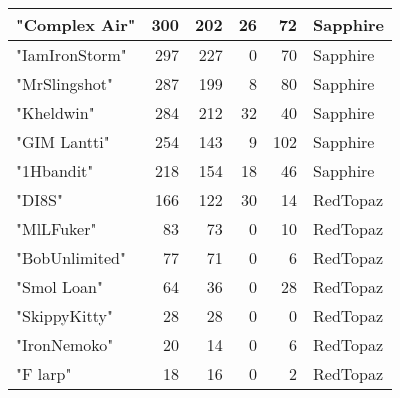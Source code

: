 \documentclass{article}
\begin{document}
\begin{table}[htbp]
\begin{tabular}{|l|r|r|r|r|l|}
"Complex Air" & 300 & 202 & 26 & 72 & Sapphire \\ \hline
"IamIronStorm" & 297 & 227 & 0 & 70 & Sapphire \\ \hline
"MrSlingshot" & 287 & 199 & 8 & 80 & Sapphire \\ \hline
"Kheldwin" & 284 & 212 & 32 & 40 & Sapphire \\ \hline
"GIM Lantti" & 254 & 143 & 9 & 102 & Sapphire \\ \hline
"1Hbandit" & 218 & 154 & 18 & 46 & Sapphire \\ \hline
"DI8S" & 166 & 122 & 30 & 14 & RedTopaz \\ \hline
"MlLFuker" & 83 & 73 & 0 & 10 & RedTopaz \\ \hline
"BobUnlimited" & 77 & 71 & 0 & 6 & RedTopaz \\ \hline
"Smol Loan" & 64 & 36 & 0 & 28 & RedTopaz \\ \hline
"SkippyKitty" & 28 & 28 & 0 & 0 & RedTopaz \\ \hline
"IronNemoko" & 20 & 14 & 0 & 6 & RedTopaz \\ \hline
"F larp" & 18 & 16 & 0 & 2 & RedTopaz \\ \hline
\end{tabular}
\end{table}
\end{document}
